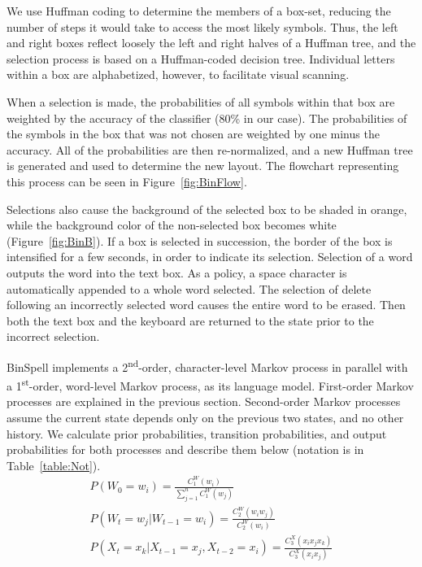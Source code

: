 \documentclass[12pt,titlepage]{article}
\begin{document}
We use Huffman coding to determine the members of a box-set,  reducing the number of steps it would 
take to access the most likely symbols.  Thus, the left and right boxes reflect loosely the left and right 
halves of a Huffman tree, and the selection process is based on a Huffman-coded decision tree.  Individual letters within a box are alphabetized, however, to facilitate visual scanning.

When a selection is made, the probabilities of all symbols within that box are weighted by the accuracy 
of the classifier (80\% in our case).  The probabilities of the symbols in the box that was not chosen are 
weighted by one minus the accuracy.  All of the probabilities are then re-normalized, and a new 
Huffman tree is generated and used to determine the new layout.  The flowchart representing this 
process can be seen in Figure~\ref{fig:BinFlow}.

Selections also cause the background of the selected box to be shaded in orange, while the background 
color of the non-selected box becomes white (Figure~\ref{fig:BinB}).  If a box is selected in succession, the border of the 
box is intensified for a few seconds, in order to indicate its selection.  Selection of a word outputs the 
word into the text box.  As a policy, a space character is automatically appended to a whole word 
selected.  The selection of delete following an incorrectly selected word causes the entire word to be 
erased.  Then both the text box and the keyboard are returned to the state prior to the incorrect 
selection.

BinSpell implements a 2\textsuperscript{nd}-order, character-level Markov process in parallel with a 1\textsuperscript{st}-order, word-level 
Markov process, as its language model.  First-order Markov processes are explained in the previous 
section.  Second-order Markov processes assume the current state depends only on the previous two 
states, and no other history.  We calculate prior probabilities, transition probabilities, and output 
probabilities for both processes and describe them below (notation is in Table~\ref{table:Not}).
\begin{gather*}
P(W_0 = w_i) = \frac{C_1^W(w_i)}{\displaystyle \sum_{j=1}^n C_1^W(w_j)} \tag{4} \\
P(W_t = w_j | W_{t-1} = w_i) = \frac{C_2^W(w_i w_j)}{\displaystyle C_2^W(w_i)} \tag{5} \\
P(X_t = x_k | X_{t-1} = x_j, X_{t-2} = x_i) = \frac{C_3^X(x_i x_j x_k)}{\displaystyle C_3^X(x_i x_j)} \tag{6}
\end{gather*}
\end{document}
